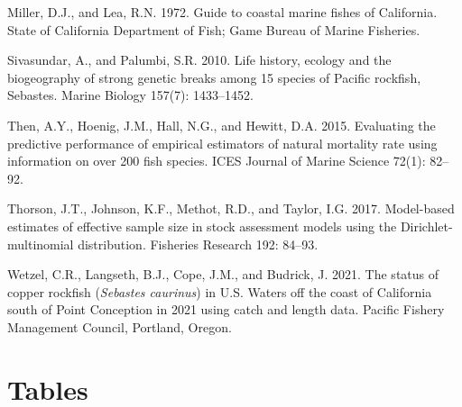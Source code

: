 \documentclass[11pt,
  english,
  a4paper,
]{article}
\newlength{\cslhangindent}
\newenvironment{CSLReferences}[2] %
 {%
  \setlength{\parindent}{0pt}
  \ifodd #1 \everypar{\setlength{\hangindent}{\cslhangindent}}\ignorespaces\fi
  \ifnum #2 > 0
  \setlength{\parskip}{#2\baselineskip}
  \fi
 }%
 {}
\begin{document}
\begin{CSLReferences}{1}{0}
\leavevmode{}%
Miller, D.J., and Lea, R.N. 1972. Guide to coastal marine fishes of {California}. State of California Department of Fish; Game Bureau of Marine Fisheries.

\leavevmode{}%
Sivasundar, A., and Palumbi, S.R. 2010. Life history, ecology and the biogeography of strong genetic breaks among 15 species of {Pacific} rockfish, {Sebastes}. Marine Biology 157(7): 1433--1452.

\leavevmode{}%
Then, A.Y., Hoenig, J.M., Hall, N.G., and Hewitt, D.A. 2015. Evaluating the predictive performance of empirical estimators of natural mortality rate using information on over 200 fish species. ICES Journal of Marine Science 72(1): 82--92.

\leavevmode{}%
Thorson, J.T., Johnson, K.F., Methot, R.D., and Taylor, I.G. 2017. Model-based estimates of effective sample size in stock assessment models using the {Dirichlet}-multinomial distribution. Fisheries Research 192: 84--93.

\leavevmode{}%
Wetzel, C.R., Langseth, B.J., Cope, J.M., and Budrick, J. 2021. The status of copper rockfish (\emph{{Sebastes} caurinus}) in {U}.{S}. Waters off the coast of {California} south of {Point} {Conception} in 2021 using catch and length data. Pacific Fishery Management Council, Portland, Oregon.

\end{CSLReferences}

\leavevmode\tagmcend\tagstructend

\clearpage


\hypertarget{tables}{%
\section{Tables}\label{tables}}

\leavevmode\tagmcend\tagstructend



\newpage

\begingroup\fontsize{10}{12}\selectfont
\begingroup\fontsize{10}{12}\selectfont
\end{document}
